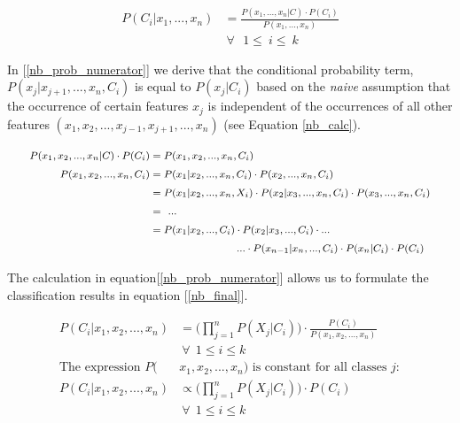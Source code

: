 	\begin{equation}
		\begin{aligned}
			P(C_i|x_1, ... , x_n) &= \frac{P(x_1, ... , x_n |C) \cdot P(C_i)}{P(x_1, ... ,x_n)} \\
			& \ \forall \ \ \  1 \leq \ i \leq \ k
		\end{aligned}
		\label{nb_post_prob}
	\end{equation}
	
		In [\ref{nb_prob_numerator}] we derive that the conditional probability term, $ P(x_j|x_{j+1}, ...,x_n,C_i) $ is equal to $ P(x_j|C_i) $ based on the \textit{naive} assumption that the occurrence of certain features $ x_j $ is independent of the occurrences of all other features $ (x_1,x_2,..., x_{j-1},x_{j+1}, ...,x_n) $ (see Equation \ref{nb_calc}).
	
	\begin{equation}
		\begingroup\makeatletter\def\f@size{8}\check@mathfonts
			\begin{aligned}
				P(x_1,x_2, ..., x_n |C) \cdot P(C_i) &= P(x_1,x_2,...,x_n,C_i) \\
				P(x_1,x_2, ..., x_n,C_i) &= P(x_1|x_2, ...,x_n,C_i) \cdot P(x_2, ...,x_n,C_i) \\
				&= P(x_1|x_2, ...,x_n,X_i) \cdot P(x_2|x_3, ..., x_n, C_i) \cdot P(x_3, ..., x_n,C_i) \\
				&= \ ... \\
				&= P(x_1|x_2, ...,C_i) \cdot P(x_2|x_3, ...,C_i) \cdot ... \\
				& \ \ \ \ \ \ \ \ \ \ \ \ \ \ \ \ \ \ \ \ \ 
				... \cdot P(x_{n-1}|x_n, ...,C_i) \cdot P(x_n|C_i) \cdot P(C_i)
			\end{aligned}
		\endgroup
		\label{nb_prob_numerator}
	\end{equation}
	
		The calculation in equation[\ref{nb_prob_numerator}] allows us to formulate the classification results in equation [\ref{nb_final}].
	
	\begin{equation}
		\begin{aligned}
			P(C_i|x_1,x_2, ...,x_n) &= \Bigg(
			\prod_{j=1}^n  P(X_j|C_i)
			\Bigg) \cdot
			\frac{P(C_i)}{P(x_1,x_2, ..., x_n)}\\ 
			&\ \forall \ \  1 \leq i \leq k \\
			\text{The expression } P(&x_1,x_2, ...,x_n)\text{ is constant for all classes } j: \\
			P(C_i|x_1,x_2, ...,x_n)& \propto \Bigg(
			\prod_{j=1}^n  P(X_j|C_i)
			\Bigg) \cdot P(C_i) \\
			&\ \forall \ \  1 \leq i \leq k 
		\end{aligned}
		\label{nb_final}
	\end{equation}
	
